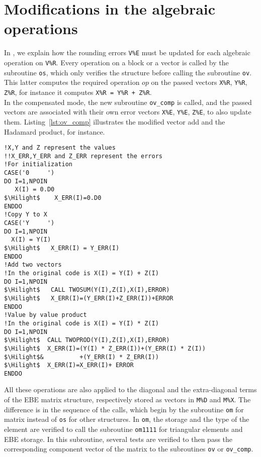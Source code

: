 \section{Modifications in the algebraic operations }
\label{sec:imple_op}
%
In \cite{LaND16}, we explain how the
rounding errors \texttt{V\%E} must be updated for each
algebraic operation on \texttt{V\%R}.
Every operation on a block or a vector is called by
the subroutine \texttt{os}, which only verifies the structure
before calling the subroutine \texttt{ov}.
This latter computes the required operation $op$
on the passed vectors \texttt{X\%R}, \texttt{Y\%R}, \texttt{Z\%R},
for instance it computes \texttt{X\%R = Y\%R + Z\%R}.\\
%
In the compensated mode, the new subroutine
\texttt{ov\_comp} is called, and the passed vectors
are associated with their own error vectors
\texttt{X\%E}, \texttt{Y\%E}, \texttt{Z\%E}, to also update them.
Listing~\ref{lst:ov_comp} illustrates the modified vector add and
the Hadamard product, for instance.
%
\begin{lstlisting}[language=TelFortran, caption={The algebraic operations in \texttt{ov\_comp} },label={lst:ov_comp},escapechar=\$]
!X,Y and Z represent the values
!!X_ERR,Y_ERR and Z_ERR represent the errors
!For initialization
CASE('0     ')
DO I=1,NPOIN
   X(I) = 0.D0
$\Hilight$    X_ERR(I)=0.D0
ENDDO
!Copy Y to X
CASE('Y     ')
DO I=1,NPOIN
  X(I) = Y(I)
$\Hilight$   X_ERR(I) = Y_ERR(I)
ENDDO
!Add two vectors
!In the original code is X(I) = Y(I) + Z(I)
DO I=1,NPOIN
$\Hilight$   CALL TWOSUM(Y(I),Z(I),X(I),ERROR)
$\Hilight$   X_ERR(I)=(Y_ERR(I)+Z_ERR(I))+ERROR
ENDDO
!Value by value product
!In the original code is X(I) = Y(I) * Z(I)
DO I=1,NPOIN
$\Hilight$  CALL TWOPROD(Y(I),Z(I),X(I),ERROR)
$\Hilight$  X_ERR(I)=(Y(I) * Z_ERR(I))+(Y_ERR(I) * Z(I))
$\Hilight$&          +(Y_ERR(I) * Z_ERR(I))
$\Hilight$  X_ERR(I)=X_ERR(I)+ ERROR
ENDDO
\end{lstlisting}
%
All these operations are also applied to the diagonal and
the extra-diagonal terms of the EBE matrix structure,
respectively stored as vectors in \texttt{M\%D} and \texttt{M\%X}.
The difference is in the sequence of the calls, which begin
by the subroutine \texttt{om} for matrix instead of \texttt{os}
for other structures.
In \texttt{om}, the storage and the type of the
element are verified to call the subroutine \texttt{om1111}
for triangular elements and EBE storage.
In this subroutine, several tests are verified to then
pass the corresponding component vector of the matrix
to the subroutines \texttt{ov} or \texttt{ov\_comp}.
